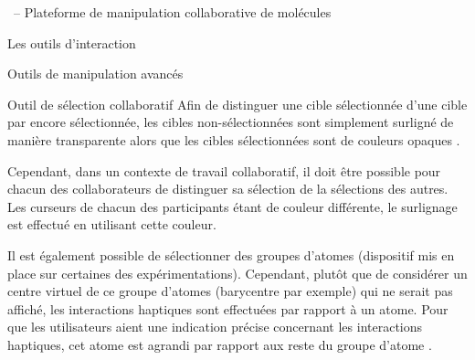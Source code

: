 \documentclass[myfrancais,ngerman,english,frenchb]{mythesis}
\begin{document}
\begin{mychapter}{\myShaddock\ -- Plateforme de manipulation collaborative de molécules}
\begin{mysection}{Les outils d'interaction}
\begin{mysubsection}{Outils de manipulation avancés}
\begin{mysubsubsection}{Outil de sélection collaboratif}
					Afin de distinguer une cible sélectionnée d'une cible par encore sélectionnée, les cibles non-sélectionnées sont simplement surligné de manière transparente alors que les cibles sélectionnées sont de couleurs opaques .

					Cependant, dans un contexte de travail collaboratif, il doit être possible pour chacun des collaborateurs de distinguer sa sélection de la sélections des autres.
					Les curseurs de chacun des participants étant de couleur différente, le surlignage est effectué en utilisant cette couleur.

					Il est également possible de sélectionner des groupes d'atomes (dispositif mis en place sur certaines des expérimentations).
					Cependant, plutôt que de considérer un centre virtuel de ce groupe d'atomes (barycentre par exemple) qui ne serait pas affiché, les interactions haptiques sont effectuées par rapport à un atome.
					Pour que les utilisateurs aient une indication précise concernant les interactions haptiques, cet atome est agrandi par rapport aux reste du groupe d'atome .


\end{mysubsubsection}
\end{mysubsection}
\end{mysection}
\end{mychapter}
\end{document}

